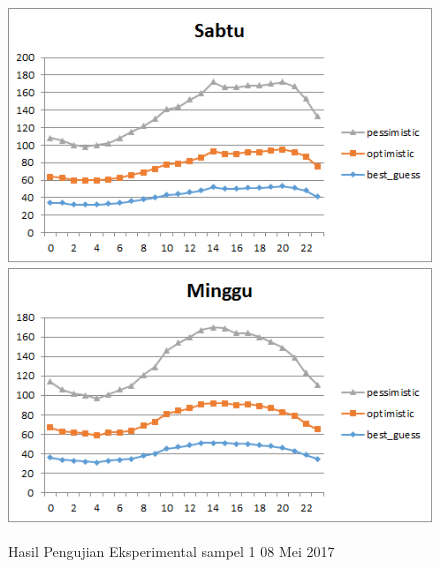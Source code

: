 			\begin{figure}[H]
				\centering	
				\includegraphics[]{Gambar/sabtusampel108052017.png}
				\includegraphics[]{Gambar/minggusampel108052017.png}
				\caption[Hasil Pengujian Eksperimental]{Hasil Pengujian Eksperimental sampel 1 08 Mei 2017}
				\label{fig:eksperimentalsampel108052017}
				\end{figure}

				\newpage
				
